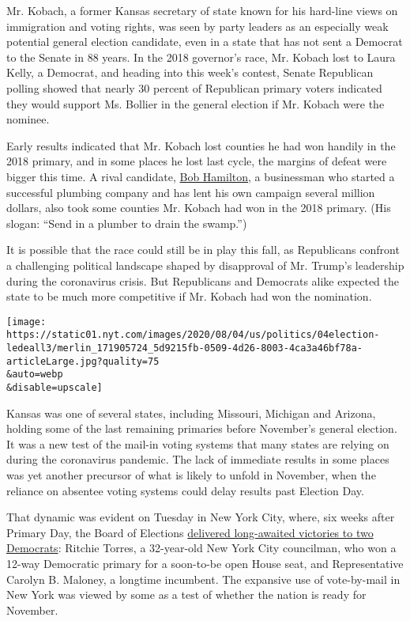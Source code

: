 Mr. Kobach, a former Kansas secretary of state known for his hard-line
views on immigration and voting rights, was seen by party leaders as an
especially weak potential general election candidate, even in a state
that has not sent a Democrat to the Senate in 88 years. In the 2018
governor's race, Mr. Kobach lost to Laura Kelly, a Democrat, and heading
into this week's contest, Senate Republican polling showed that nearly
30 percent of Republican primary voters indicated they would support Ms.
Bollier in the general election if Mr. Kobach were the nominee.

Early results indicated that Mr. Kobach lost counties he had won handily
in the 2018 primary, and in some places he lost last cycle, the margins
of defeat were bigger this time. A rival candidate,
\href{https://www.kansascity.com/news/politics-government/article244374532.html}{Bob
Hamilton}, a businessman who started a successful plumbing company and
has lent his own campaign several million dollars, also took some
counties Mr. Kobach had won in the 2018 primary. (His slogan: ``Send in
a plumber to drain the swamp.'')

It is possible that the race could still be in play this fall, as
Republicans confront a challenging political landscape shaped by
disapproval of Mr. Trump's leadership during the coronavirus crisis. But
Republicans and Democrats alike expected the state to be much more
competitive if Mr. Kobach had won the nomination.

\texttt{[image: https://static01.nyt.com/images/2020/08/04/us/politics/04election-ledeall3/merlin\_171905724\_5d9215fb-0509-4d26-8003-4ca3a46bf78a-articleLarge.jpg?quality=75\\\&auto=webp\\\&disable=upscale]}

Kansas was one of several states, including Missouri, Michigan and
Arizona, holding some of the last remaining primaries before November's
general election. It was a new test of the mail-in voting systems that
many states are relying on during the coronavirus pandemic. The lack of
immediate results in some places was yet another precursor of what is
likely to unfold in November, when the reliance on absentee voting
systems could delay results past Election Day.

That dynamic was evident on Tuesday in New York City, where, six weeks
after Primary Day, the Board of Elections
\href{https://www.nytimes.com/2020/08/04/nyregion/maloney-torres-ny-congressional-races.html}{delivered
long-awaited victories to two Democrats}: Ritchie Torres, a 32-year-old
New York City councilman, who won a 12-way Democratic primary for a
soon-to-be open House seat, and Representative Carolyn B. Maloney, a
longtime incumbent. The expansive use of vote-by-mail in New York was
viewed by some as a test of whether the nation is ready for November.

